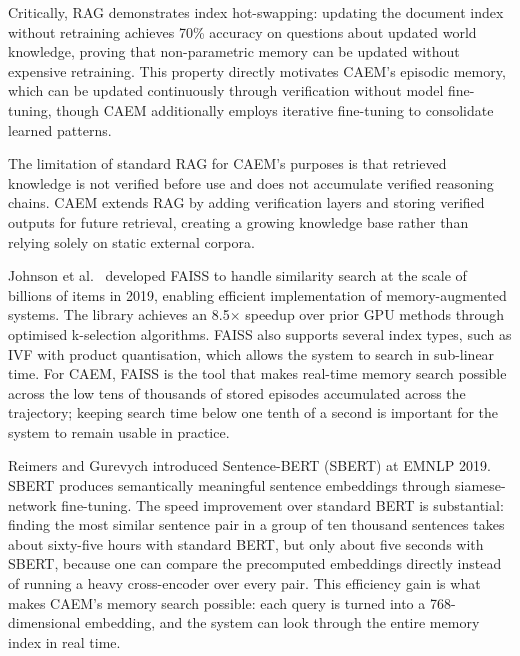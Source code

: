 Critically, RAG demonstrates index hot-swapping: updating the document index without retraining achieves 70\% accuracy on questions about updated world knowledge, proving that non-parametric memory can be updated without expensive retraining. This property directly motivates CAEM's episodic memory, which can be updated continuously through verification without model fine-tuning, though CAEM additionally employs iterative fine-tuning to consolidate learned patterns.

The limitation of standard RAG for CAEM's purposes is that retrieved knowledge is not verified before use and does not accumulate verified reasoning chains. CAEM extends RAG by adding verification layers and storing verified outputs for future retrieval, creating a growing knowledge base rather than relying solely on static external corpora.

Johnson et al.\ \cite{8733051} developed FAISS to handle similarity search at the scale of billions of items in 2019, enabling efficient implementation of memory-augmented systems. The library achieves an 8.5$\times$ speedup over prior GPU methods through optimised k-selection algorithms. FAISS also supports several index types, such as IVF with product quantisation, which allows the system to search in sub-linear time. For CAEM, FAISS is the tool that makes real-time memory search possible across the low tens of thousands of stored episodes accumulated across the trajectory; keeping search time below one tenth of a second is important for the system to remain usable in practice.

Reimers and Gurevych \cite{reimers-gurevych-2019-sentence} introduced Sentence-BERT (SBERT) at EMNLP 2019. SBERT produces semantically meaningful sentence embeddings through siamese-network fine-tuning. The speed improvement over standard BERT is substantial: finding the most similar sentence pair in a group of ten thousand sentences takes about sixty-five hours with standard BERT, but only about five seconds with SBERT, because one can compare the precomputed embeddings directly instead of running a heavy cross-encoder over every pair. This efficiency gain is what makes CAEM's memory search possible: each query is turned into a 768-dimensional embedding, and the system can look through the entire memory index in real time.


